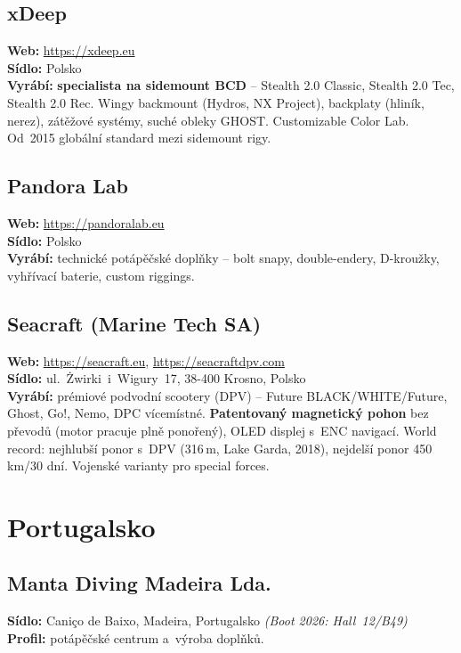 \documentclass[11pt,a4paper]{article}
\begin{document}
\subsection{xDeep}
\textbf{Web:} \url{https://xdeep.eu} \\
\textbf{Sídlo:} Polsko \\
\textbf{Vyrábí:} \textbf{specialista na sidemount BCD} -- Stealth 2.0 Classic, Stealth 2.0 Tec, Stealth 2.0 Rec. Wingy backmount (Hydros, NX Project), backplaty (hliník, nerez), zátěžové systémy, suché obleky GHOST. Customizable Color Lab. Od~2015 globální standard mezi sidemount rigy.

\subsection{Pandora Lab}
\textbf{Web:} \url{https://pandoralab.eu} \\
\textbf{Sídlo:} Polsko \\
\textbf{Vyrábí:} technické potápěčské doplňky -- bolt snapy, double-endery, D-kroužky, vyhřívací baterie, custom riggings.

\subsection{Seacraft (Marine Tech SA)}
\textbf{Web:} \url{https://seacraft.eu}, \url{https://seacraftdpv.com} \\
\textbf{Sídlo:} ul.~Żwirki~i~Wigury~17, 38-400 Krosno, Polsko \\
\textbf{Vyrábí:} prémiové podvodní scootery (DPV) -- Future BLACK/WHITE/Future, Ghost, Go!, Nemo, DPC vícemístné. \textbf{Patentovaný magnetický pohon} bez převodů (motor pracuje plně ponořený), OLED displej s~ENC navigací. World record: nejhlubší ponor s~DPV (316\,m, Lake Garda, 2018), nejdelší ponor 450\,km/30 dní. Vojenské varianty pro special forces.

\section{Portugalsko}

\subsection{Manta Diving Madeira Lda.}
\textbf{Sídlo:} Caniço de Baixo, Madeira, Portugalsko \quad\emph{(Boot 2026: Hall~12/B49)} \\
\textbf{Profil:} potápěčské centrum a~výroba doplňků.
\end{document}
